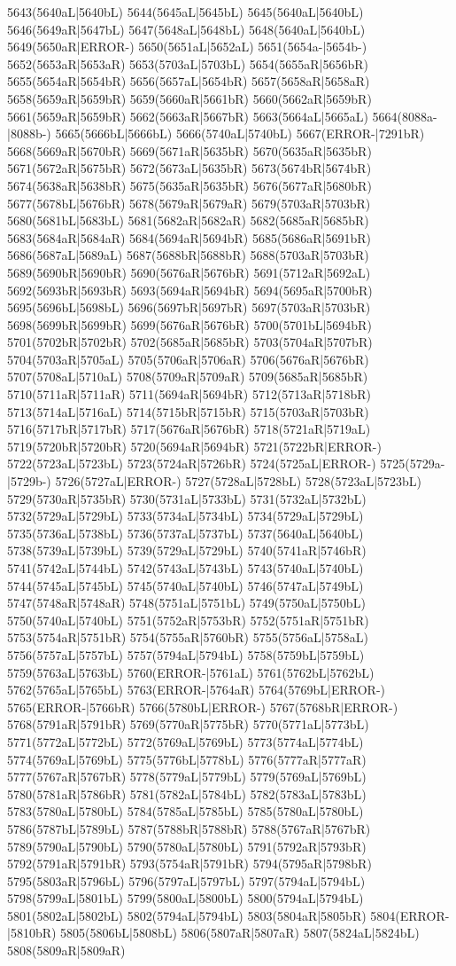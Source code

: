 5643(5640aL|5640bL) 5644(5645aL|5645bL) 5645(5640aL|5640bL) 5646(5649aR|5647bL) 5647(5648aL|5648bL) 5648(5640aL|5640bL) 5649(5650aR|ERROR-) 5650(5651aL|5652aL) 5651(5654a-|5654b-) 5652(5653aR|5653aR) 5653(5703aL|5703bL) 5654(5655aR|5656bR) 5655(5654aR|5654bR) 5656(5657aL|5654bR) 5657(5658aR|5658aR) 5658(5659aR|5659bR) 5659(5660aR|5661bR) 5660(5662aR|5659bR) 5661(5659aR|5659bR) 5662(5663aR|5667bR) 5663(5664aL|5665aL) 5664(8088a-|8088b-) 5665(5666bL|5666bL) 5666(5740aL|5740bL) 5667(ERROR-|7291bR) 5668(5669aR|5670bR) 5669(5671aR|5635bR) 5670(5635aR|5635bR) 5671(5672aR|5675bR) 5672(5673aL|5635bR) 5673(5674bR|5674bR) 5674(5638aR|5638bR) 5675(5635aR|5635bR) 5676(5677aR|5680bR) 5677(5678bL|5676bR) 5678(5679aR|5679aR) 5679(5703aR|5703bR) 5680(5681bL|5683bL) 5681(5682aR|5682aR) 5682(5685aR|5685bR) 5683(5684aR|5684aR) 5684(5694aR|5694bR) 5685(5686aR|5691bR) 5686(5687aL|5689aL) 5687(5688bR|5688bR) 5688(5703aR|5703bR) 5689(5690bR|5690bR) 5690(5676aR|5676bR) 5691(5712aR|5692aL) 5692(5693bR|5693bR) 5693(5694aR|5694bR) 5694(5695aR|5700bR) 5695(5696bL|5698bL) 5696(5697bR|5697bR) 5697(5703aR|5703bR) 5698(5699bR|5699bR) 5699(5676aR|5676bR) 5700(5701bL|5694bR) 5701(5702bR|5702bR) 5702(5685aR|5685bR) 5703(5704aR|5707bR) 5704(5703aR|5705aL) 5705(5706aR|5706aR) 5706(5676aR|5676bR) 5707(5708aL|5710aL) 5708(5709aR|5709aR) 5709(5685aR|5685bR) 5710(5711aR|5711aR) 5711(5694aR|5694bR) 5712(5713aR|5718bR) 5713(5714aL|5716aL) 5714(5715bR|5715bR) 5715(5703aR|5703bR) 5716(5717bR|5717bR) 5717(5676aR|5676bR) 5718(5721aR|5719aL) 5719(5720bR|5720bR) 5720(5694aR|5694bR) 5721(5722bR|ERROR-) 5722(5723aL|5723bL) 5723(5724aR|5726bR) 5724(5725aL|ERROR-) 5725(5729a-|5729b-) 5726(5727aL|ERROR-) 5727(5728aL|5728bL) 5728(5723aL|5723bL) 5729(5730aR|5735bR) 5730(5731aL|5733bL) 5731(5732aL|5732bL) 5732(5729aL|5729bL) 5733(5734aL|5734bL) 5734(5729aL|5729bL) 5735(5736aL|5738bL) 5736(5737aL|5737bL) 5737(5640aL|5640bL) 5738(5739aL|5739bL) 5739(5729aL|5729bL) 5740(5741aR|5746bR) 5741(5742aL|5744bL) 5742(5743aL|5743bL) 5743(5740aL|5740bL) 5744(5745aL|5745bL) 5745(5740aL|5740bL) 5746(5747aL|5749bL) 5747(5748aR|5748aR) 5748(5751aL|5751bL) 5749(5750aL|5750bL) 5750(5740aL|5740bL) 5751(5752aR|5753bR) 5752(5751aR|5751bR) 5753(5754aR|5751bR) 5754(5755aR|5760bR) 5755(5756aL|5758aL) 5756(5757aL|5757bL) 5757(5794aL|5794bL) 5758(5759bL|5759bL) 5759(5763aL|5763bL) 5760(ERROR-|5761aL) 5761(5762bL|5762bL) 5762(5765aL|5765bL) 5763(ERROR-|5764aR) 5764(5769bL|ERROR-) 5765(ERROR-|5766bR) 5766(5780bL|ERROR-) 5767(5768bR|ERROR-) 5768(5791aR|5791bR) 5769(5770aR|5775bR) 5770(5771aL|5773bL) 5771(5772aL|5772bL) 5772(5769aL|5769bL) 5773(5774aL|5774bL) 5774(5769aL|5769bL) 5775(5776bL|5778bL) 5776(5777aR|5777aR) 5777(5767aR|5767bR) 5778(5779aL|5779bL) 5779(5769aL|5769bL) 5780(5781aR|5786bR) 5781(5782aL|5784bL) 5782(5783aL|5783bL) 5783(5780aL|5780bL) 5784(5785aL|5785bL) 5785(5780aL|5780bL) 5786(5787bL|5789bL) 5787(5788bR|5788bR) 5788(5767aR|5767bR) 5789(5790aL|5790bL) 5790(5780aL|5780bL) 5791(5792aR|5793bR) 5792(5791aR|5791bR) 5793(5754aR|5791bR) 5794(5795aR|5798bR) 5795(5803aR|5796bL) 5796(5797aL|5797bL) 5797(5794aL|5794bL) 5798(5799aL|5801bL) 5799(5800aL|5800bL) 5800(5794aL|5794bL) 5801(5802aL|5802bL) 5802(5794aL|5794bL) 5803(5804aR|5805bR) 5804(ERROR-|5810bR) 5805(5806bL|5808bL) 5806(5807aR|5807aR) 5807(5824aL|5824bL) 5808(5809aR|5809aR) 